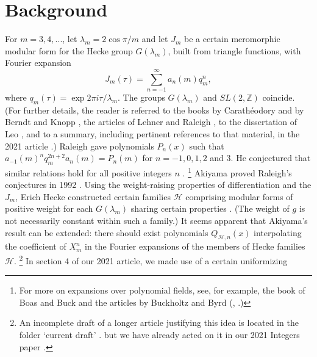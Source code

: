 \documentclass{article}
\begin{document}
\section{Background}
For $m = 3, 4, ...$,
let $\lambda_m = 2 \cos \pi/m$ and
let $J_m$ be a certain meromorphic
modular form for the Hecke group $G(\lambda_m)$,
built from triangle functions, 
with Fourier expansion
$$
J_m(\tau) = \sum_{n=-1}^\infty a_n(m)q_m^n,
$$
where
$q_m(\tau) = \exp 2 \pi i \tau/\lambda_m$.
The groups $G(\lambda_m)$ and $
SL(2,\mathbb{Z})$ coincide.
(For further details, the reader
is referred to the books by 
 Carath{\'e}odory
\cite{caratheodory1, caratheodory2}
and by Berndt and Knopp
\cite{berndt2008hecke},
the articles of Lehner and Raleigh
\cite{lehner1954note, raleigh1962fourier},
to the dissertation of Leo 
\cite{leo2008fourier}, and to a
summary, including pertinent references
to that material, in the
2021 article \cite{interpolating}.)
\newline \newline \noindent
Raleigh gave polynomials $P_n(x)$ such that 
$a_{-1}(m)^n q_m^{2n+2} a_n(m) = P_n(m)$
for  $n = -1, 0, 1, 2$ and $3$.
He conjectured that similar 
relations hold for all positive integers
$n$ \cite{raleigh1962fourier}.
\footnote{For more on
expansions over polynomial fields, see, for 
example, the book of Boas and Buck 
\cite{boas2013polynomial} and the articles 
by Buckholtz and Byrd (\cite{buckholtz1973series},
\cite{byrd}.)}
Akiyama proved Raleigh's conjectures
in 1992 \cite{akiyama1992note}.
\newline \newline \noindent
Using the weight-raising properties of 
differentiation and the $J_m$, Erich
Hecke constructed
certain families 
$\mathcal{H}$
comprising modular forms 
of positive weight
for each $G(\lambda_m)$
sharing certain properties 
\cite{hecke1936, berndt2008hecke}. 
(The weight of $g$ is not necessarily
constant within such a family.)
It seems apparent that Akiyama's 
result can be extended:
there should exist polynomials 
$Q_{\mathcal{H},n}(x)$ 
interpolating the coefficient of $X_m^n$
in the Fourier expansions of the
members of Hecke families
$\mathcal{H}$. \footnote{An
incomplete draft
of a longer
article justifying this idea is
located in the folder `current draft' 
\cite{githubNewmanShanks}.
but we have already acted on it in our 2021 
Integers paper \cite{interpolating}.}
\newline \newline \noindent
In section 4 of our 2021 article,
we made use of a certain uniformizing
\end{document}
